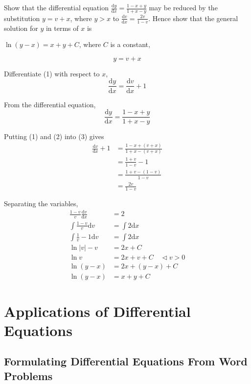\documentclass[11pt,a4paper]{book}
\begin{document}
\newpage

\begin{example}

Show that the differential equation ${\displaystyle \frac{\mathrm{d}y}{\mathrm{d}x}=\frac{1-x+y}{1+x-y}}$
may be reduced by the substitution $y=v+x$, where $y>x$ to ${\displaystyle \frac{\mathrm{d}v}{\mathrm{d}x}=\frac{2v}{1-v}}$.
Hence show that the general solution for $y$ in terms of $x$ is

$\ln\left(y-x\right)=x+y+C$, where $C$ is a constant,

\Solution

\[
y=v+x\tag{1}
\]

Differentiate (1) with respect to $x$,
\[
\frac{\mathrm{d}y}{\mathrm{d}x}=\frac{\mathrm{d}v}{\mathrm{d}x}+1\tag{2}
\]

From the differential equation,
\[
\frac{\mathrm{d}y}{\mathrm{d}x}=\frac{1-x+y}{1+x-y}\tag{3}
\]

Putting (1) and (2) into (3) gives
\begin{align*}
\frac{\mathrm{d}v}{\mathrm{d}x}+1 & =\frac{1-x+\left(v+x\right)}{1+x-\left(v+x\right)}\\
 & =\frac{1+v}{1-v}-1\\
 & =\frac{1+v-\left(1-v\right)}{1-v}\\
 & =\frac{2v}{1-v}
\end{align*}

Separating the variables,
\begin{align*}
\frac{1-v}{v}\frac{\mathrm{d}v}{\mathrm{d}x} & =2\\
\int\frac{1-v}{v}\mathrm{d}v & =\int2\mathrm{d}x\\
\int\frac{1}{v}-1\mathrm{d}v & =\int2\mathrm{d}x\\
\ln\left|v\right|-v & =2x+C\\
\ln v & =2x+v+C\quad\triangleleft v>0\\
\ln\left(y-x\right) & =2x+\left(y-x\right)+C\\
\ln\left(y-x\right) & =x+y+C
\end{align*}

\end{example}

\newpage

\section{Applications of Differential Equations}

\subsection{Formulating Differential Equations From Word Problems}
\end{document}
